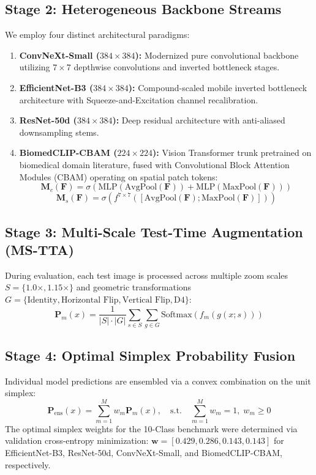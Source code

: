 \documentclass[journal]{IEEEtran}
\begin{document}
\subsection{Stage 2: Heterogeneous Backbone Streams}
We employ four distinct architectural paradigms:
\begin{enumerate}
    \item \textbf{ConvNeXt-Small ($384\times 384$):} Modernized pure convolutional backbone utilizing $7\times 7$ depthwise convolutions and inverted bottleneck stages.
    \item \textbf{EfficientNet-B3 ($384\times 384$):} Compound-scaled mobile inverted bottleneck architecture with Squeeze-and-Excitation channel recalibration.
    \item \textbf{ResNet-50d ($384\times 384$):} Deep residual architecture with anti-aliased downsampling stems.
    \item \textbf{BiomedCLIP-CBAM ($224\times 224$):} Vision Transformer trunk pretrained on biomedical domain literature, fused with Convolutional Block Attention Modules (CBAM) operating on spatial patch tokens:
    \begin{equation}
        \mathbf{M}_c(\mathbf{F}) = \sigma(\text{MLP}(\text{AvgPool}(\mathbf{F})) + \text{MLP}(\text{MaxPool}(\mathbf{F})))
    \end{equation}
    \begin{equation}
        \mathbf{M}_s(\mathbf{F}) = \sigma(f^{7\times 7}([\text{AvgPool}(\mathbf{F}); \text{MaxPool}(\mathbf{F})]))
    \end{equation}
\end{enumerate}

\subsection{Stage 3: Multi-Scale Test-Time Augmentation (MS-TTA)}
During evaluation, each test image is processed across multiple zoom scales $S = \{1.0\times, 1.15\times\}$ and geometric transformations $G = \{\text{Identity}, \text{Horizontal Flip}, \text{Vertical Flip}, \text{D4}\}$:
\begin{equation}
    \mathbf{P}_m(x) = \frac{1}{|S| \cdot |G|} \sum_{s \in S} \sum_{g \in G} \text{Softmax}(f_m(g(x; s)))
\end{equation}

\subsection{Stage 4: Optimal Simplex Probability Fusion}
Individual model predictions are ensembled via a convex combination on the unit simplex:
\begin{equation}
    \mathbf{P}_{\text{ens}}(x) = \sum_{m=1}^M w_m \mathbf{P}_m(x), \quad \text{s.t.} \quad \sum_{m=1}^M w_m = 1, \; w_m \ge 0
\end{equation}
The optimal simplex weights for the 10-Class benchmark were determined via validation cross-entropy minimization: $\mathbf{w} = [0.429, 0.286, 0.143, 0.143]$ for EfficientNet-B3, ResNet-50d, ConvNeXt-Small, and BiomedCLIP-CBAM, respectively.
\end{document}
